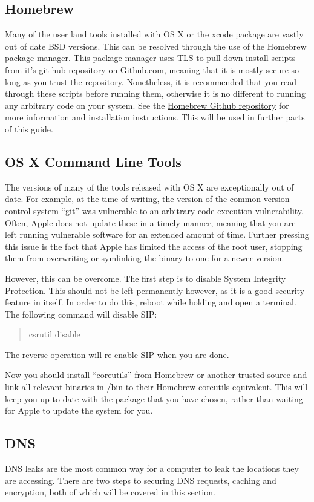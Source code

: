 \documentclass[a4paper,11pt]{report}
\begin{document}
			\subsection{Homebrew}
				Many of the user land tools installed with OS X or the xcode package are vastly out of date BSD versions. 
				This can be resolved through the use of the Homebrew package manager. 
				This package manager uses TLS to pull down install scripts from it's git hub repository on Github.com, meaning that it is mostly secure so long as you trust the repository. 
				Nonetheless, it is recommended that you read through these scripts before running them, otherwise it is no different to running any arbitrary code on your system. 
				See the \href{https://github.com/Homebrew/homebrew}{Homebrew Github repository} for more information and installation instructions. 
				This will be used in further parts of this guide.
			\subsection{OS X Command Line Tools}
				The versions of many of the tools released with OS X are exceptionally out of date. 
				For example, at the time of writing, the version of the common version control system ``git'' was vulnerable to an arbitrary code execution vulnerability. 
				Often, Apple does not update these in a timely manner, meaning that you are left running vulnerable software for an extended amount of time. 
				Further pressing this issue is the fact that Apple has limited the access of the root user, stopping them from overwriting or symlinking the binary to one for a newer version. 

				However, this can be overcome.
				The first step is to disable System Integrity Protection. This should not be left permanently however, as it is a good security feature in itself. 
				In order to do this, reboot while holding  and open a terminal. The following command will disable SIP:
				\begin{quote}
					csrutil disable
				\end{quote}
				The reverse operation will re-enable SIP when you are done. 

				Now you should install ``coreutils'' from Homebrew or another trusted source and link all relevant binaries in /bin to their Homebrew coreutils equivalent. 
				This will keep you up to date with the package that you have chosen, rather than waiting for Apple to update the system for you. 
			\subsection{DNS}
				DNS leaks are the most common way for a computer to leak the locations they are accessing. 
				There are two steps to securing DNS requests, caching and encryption, both of which will be covered in this section. 
\end{document}
